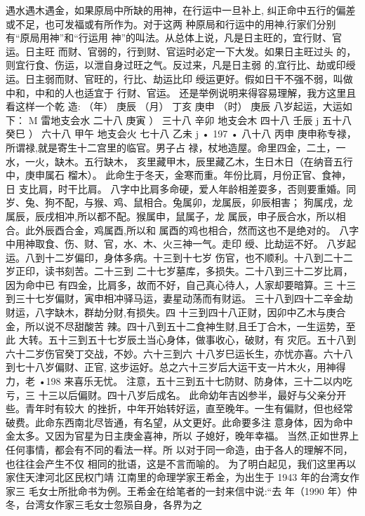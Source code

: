 遇水遇木遇金，如果原局中所缺的用神，在行运中一旦补上,
纠正命中五行的偏差或不足，也可发福或有所作为。对于这两
种原局和行运中的用神,行家们分别有“原局用神”和“行运用
神”的叫法。从总体上说，凡是日主旺的，宜行财、官运。日主旺
而财、官弱的，行到财、官运时必定一下大发。如果日主旺过头
的，则宜行食、伤运，以泄自身过旺之气。反过来，凡是日主弱
的,宜行比、劫或印绶运。日主弱而财、官旺的，行比、劫运比印
绶运更好。假如日干不强不弱，叫做中和，中和的人也适宜于
行财、官运。
还是举例说明来得容易理解，我方这里且看这样一个乾
造:
（年） 庚辰
（月） 丁亥
庚申
（时） 庚辰
八岁起运，大运如下：
M
雷地支会水
二十八 庚寅 ） 三十八 辛卯 地支会木
四十八 壬辰 j
五十八 癸巳 ） 六十八 甲午 地支会火
七十八 乙未 j
• 197 •
八十八 丙申
庚申称专禄，所谓禄,就是寄生十二宫里的临官。男子占
禄，杖地造屋。命里四金，二土，一水，一火，缺木。五行缺木，
亥里藏甲木，辰里藏乙木，生日木日（在纳音五行中，庚申属石
榴木）。
此命生于冬天，金寒而重。年份比肩，月份正官、食神，日
支比肩，时干比肩。
八字中比肩多命硬，爱人年龄相差耍多，否则要重婚。同
岁、兔、狗不配，与猴、鸡、鼠相合。兔属卯，龙属辰，卯辰相害；
狗属戌，龙属辰，辰戌相冲,所以都不配。猴属申，鼠属子，龙
属辰，申子辰合水，所以相合。此外辰酉合金，鸡属酉,所以和
属酉的鸡也相合，然而这也不是绝对的。
八字中用神取食、伤、财、官，水、木、火三神一气。走印
绶、比劫运不好。
八岁起运。八到十二岁偏印，身体多病。十三到十七岁
伤官，也不顺利。十八到二十二岁正印，读书刻苦。二十三到
二十七岁墓库，多损失。二十八到三十二岁比肩，因为命中已
有四金，比肩多，故而不好，自己真心待人，人家却要暗算。三
十三到三十七岁偏财，寅申相冲驿马运，妻星动荡而有财运。
三十八到四十二辛金劫财运，八字缺木，群劫分财,有损失。四
十三到四十八正财，因卯中乙木与庚合金，所以说不尽甜酸苦
辣。四十八到五十二食神生财,且壬丁合木，一生运势，至此
大转。五十三到五十七岁辰土当心身体，做事收心，破财，有
灾厄。五十八到六十二岁伤官癸丁交战，不妙。六十三到六
十八岁巳运长生，亦忧亦喜。六十八到七十八岁偏财、正官,
这步运好。总之六十三岁后大运干支一片木火，用神得力，老
•198
来喜乐无忧。
注意，五十三到五十七防财、防身体，三十二以内吃亏，三
十三以后偏财。四十八岁后成名。
此命幼年吉凶参半，最好与父亲分开些。青年时有较大
的挫折，中年开始转好运，直至晚年。一生有偏财，但也经常
破费。此命东西南北尽皆通，有名望，从文更好。此命要多注
意身体，因为命中金太多。又因为官星为日主庚金喜神，所以
子媳好，晚年幸福。
当然,正如世界上任何事情，都会有不同的看法一样。所
以对于同一命造，由于各人的理解不同，也往往会产生不仅
相同的批语，这是不言而喻的。
为了明白起见，我们这里再以家住天津河北区民权门靖
江南里的命理学家王希金，为出生于 1943 年的台湾女作家三
毛女士所批命书为例。王希金在给笔者的一封来信中说:“去
年（1990 年）仲冬，台湾女作家三毛女士忽殒自身，各界为之
